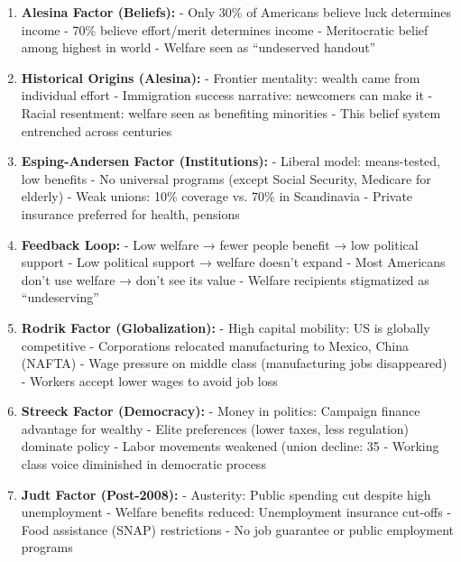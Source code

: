 \begin{enumerate}

\item \textbf{Alesina Factor (Beliefs):}
   - Only 30\% of Americans believe luck determines income
   - 70\% believe effort/merit determines income
   - Meritocratic belief among highest in world
   - Welfare seen as ``undeserved handout''

\item \textbf{Historical Origins (Alesina):}
   - Frontier mentality: wealth came from individual effort
   - Immigration success narrative: newcomers can make it
   - Racial resentment: welfare seen as benefiting minorities
   - This belief system entrenched across centuries

\item \textbf{Esping-Andersen Factor (Institutions):}
   - Liberal model: means-tested, low benefits
   - No universal programs (except Social Security, Medicare for elderly)
   - Weak unions: 10\% coverage vs. 70\% in Scandinavia
   - Private insurance preferred for health, pensions

\item \textbf{Feedback Loop:}
   - Low welfare → fewer people benefit → low political support
   - Low political support → welfare doesn't expand
   - Most Americans don't use welfare → don't see its value
   - Welfare recipients stigmatized as ``undeserving''

\item \textbf{Rodrik Factor (Globalization):}
   - High capital mobility: US is globally competitive
   - Corporations relocated manufacturing to Mexico, China (NAFTA)
   - Wage pressure on middle class (manufacturing jobs disappeared)
   - Workers accept lower wages to avoid job loss

\item \textbf{Streeck Factor (Democracy):}
   - Money in politics: Campaign finance advantage for wealthy
   - Elite preferences (lower taxes, less regulation) dominate policy
   - Labor movements weakened (union decline: 35%
   - Working class voice diminished in democratic process

\item \textbf{Judt Factor (Post-2008):}
   - Austerity: Public spending cut despite high unemployment
   - Welfare benefits reduced: Unemployment insurance cut-offs
   - Food assistance (SNAP) restrictions
   - No job guarantee or public employment programs

\end{enumerate}

